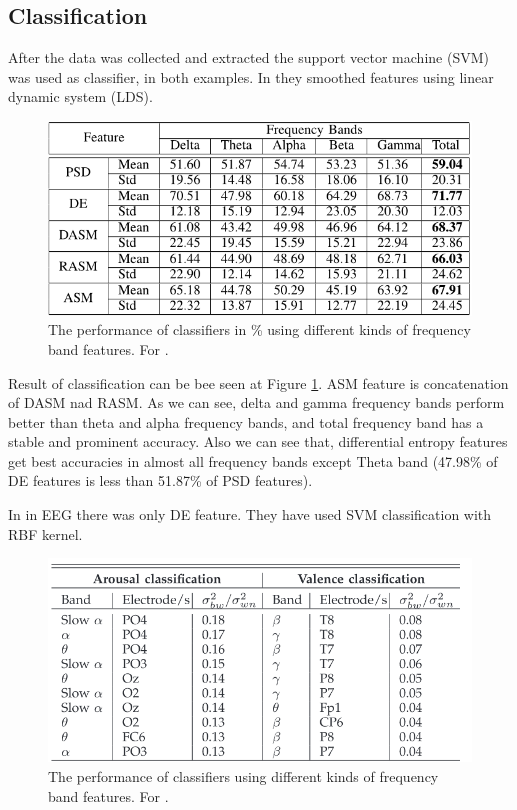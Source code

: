 \documentclass[10pt,journal,compsoc,twoside]{IEEEtran}
\newcommand{\Ref}[2]{#2 \ref{#1}}
\begin{document}
\subsection{Classification}
After the data was collected and extracted the support vector machine (SVM) was used as classifier, in both examples.
In  \cite{WeiLongBoNanBaoLiang2014} they smoothed features using linear dynamic system (LDS).

\begin{figure}[ht]
	\centering
	\includegraphics[width=1.0\linewidth]{performanceOfClassifier1}
	\caption{The performance of classifiers in \% using different kinds of frequency band features. For \cite{WeiLongBoNanBaoLiang2014}.}
	\label{fig:performanceofclassifier1}
\end{figure}
Result of classification can be bee seen at \Ref{fig:performanceofclassifier1}{Figure}. ASM feature is concatenation of DASM nad RASM. As we can see, delta and gamma frequency bands perform better than theta and alpha frequency bands, and total frequency band has a stable and  prominent  accuracy.  Also  we  can  see  that,  differential entropy features get best accuracies in almost all frequency  bands  except  Theta  band  (47.98\%  of  DE  features is  less  than  51.87\%  of  PSD  features).
\newline
\par In \cite{SoleymaniPanticPun2002} in EEG there was only DE feature. They have used SVM classification with RBF kernel.
\begin{figure}[ht]
	\centering
	\includegraphics[width=1.0\linewidth]{performanceOfClassifier2}
	\caption{The performance of classifiers using different kinds of frequency band features. For \cite{SoleymaniPanticPun2002}.}
	\label{fig:performanceofclassifier2}
\end{figure}
\end{document}
